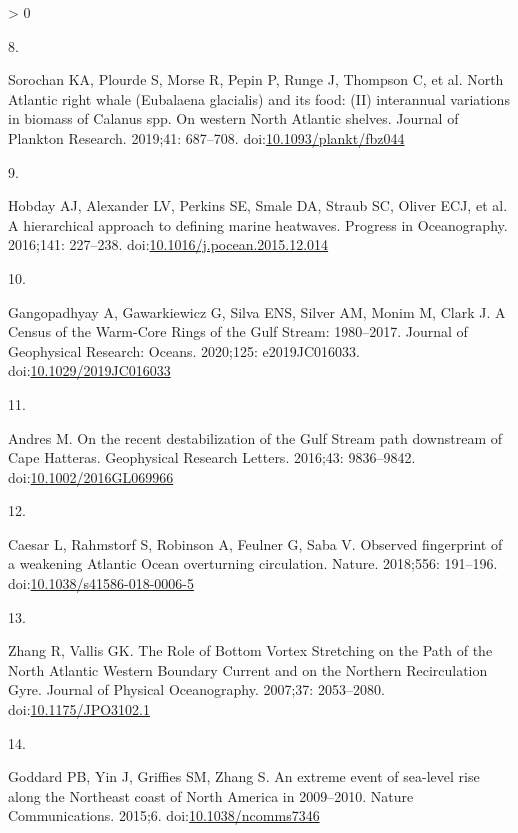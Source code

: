 \documentclass[
  10pt,
]{article}
\newlength{\cslhangindent}
\newlength{\csllabelwidth}
\newenvironment{CSLReferences}[2] %
 {%
  \setlength{\parindent}{0pt}
  \ifodd #1 \everypar{\setlength{\hangindent}{\cslhangindent}}\ignorespaces\fi
  \ifnum #2 > 0
  \setlength{\parskip}{#2\baselineskip}
  \fi
 }%
 {}
\newcommand{\CSLLeftMargin}[1]{\parbox[t]{\csllabelwidth}{#1}}
\newcommand{\CSLRightInline}[1]{\parbox[t]{\linewidth - \csllabelwidth}{#1}\break}
\begin{document}
\begin{CSLReferences}{0}{0}
\leavevmode\hypertarget{ref-sorochan_north_2019}{}%
\CSLLeftMargin{8. }
\CSLRightInline{Sorochan KA, Plourde S, Morse R, Pepin P, Runge J,
Thompson C, et al. North {Atlantic} right whale ({Eubalaena} glacialis)
and its food: ({II}) interannual variations in biomass of {Calanus} spp.
On western {North} {Atlantic} shelves. Journal of Plankton Research.
2019;41: 687--708.
doi:\href{https://doi.org/10.1093/plankt/fbz044}{10.1093/plankt/fbz044}}

\leavevmode\hypertarget{ref-hobday_hierarchical_2016}{}%
\CSLLeftMargin{9. }
\CSLRightInline{Hobday AJ, Alexander LV, Perkins SE, Smale DA, Straub
SC, Oliver ECJ, et al. A hierarchical approach to defining marine
heatwaves. Progress in Oceanography. 2016;141: 227--238.
doi:\href{https://doi.org/10.1016/j.pocean.2015.12.014}{10.1016/j.pocean.2015.12.014}}

\leavevmode\hypertarget{ref-gangopadhyay_census_2020}{}%
\CSLLeftMargin{10. }
\CSLRightInline{Gangopadhyay A, Gawarkiewicz G, Silva ENS, Silver AM,
Monim M, Clark J. A {Census} of the {Warm}-{Core} {Rings} of the {Gulf}
{Stream}: 1980--2017. Journal of Geophysical Research: Oceans. 2020;125:
e2019JC016033.
doi:\href{https://doi.org/10.1029/2019JC016033}{10.1029/2019JC016033}}

\leavevmode\hypertarget{ref-andres_recent_2016}{}%
\CSLLeftMargin{11. }
\CSLRightInline{Andres M. On the recent destabilization of the {Gulf}
{Stream} path downstream of {Cape} {Hatteras}. Geophysical Research
Letters. 2016;43: 9836--9842.
doi:\href{https://doi.org/10.1002/2016GL069966}{10.1002/2016GL069966}}

\leavevmode\hypertarget{ref-caesar_observed_2018}{}%
\CSLLeftMargin{12. }
\CSLRightInline{Caesar L, Rahmstorf S, Robinson A, Feulner G, Saba V.
Observed fingerprint of a weakening {Atlantic} {Ocean} overturning
circulation. Nature. 2018;556: 191--196.
doi:\href{https://doi.org/10.1038/s41586-018-0006-5}{10.1038/s41586-018-0006-5}}

\leavevmode\hypertarget{ref-zhang_role_2007}{}%
\CSLLeftMargin{13. }
\CSLRightInline{Zhang R, Vallis GK. The {Role} of {Bottom} {Vortex}
{Stretching} on the {Path} of the {North} {Atlantic} {Western}
{Boundary} {Current} and on the {Northern} {Recirculation} {Gyre}.
Journal of Physical Oceanography. 2007;37: 2053--2080.
doi:\href{https://doi.org/10.1175/JPO3102.1}{10.1175/JPO3102.1}}

\leavevmode\hypertarget{ref-goddard_extreme_2015}{}%
\CSLLeftMargin{14. }
\CSLRightInline{Goddard PB, Yin J, Griffies SM, Zhang S. An extreme
event of sea-level rise along the {Northeast} coast of {North} {America}
in 2009--2010. Nature Communications. 2015;6.
doi:\href{https://doi.org/10.1038/ncomms7346}{10.1038/ncomms7346}}


\end{CSLReferences}
\end{document}
